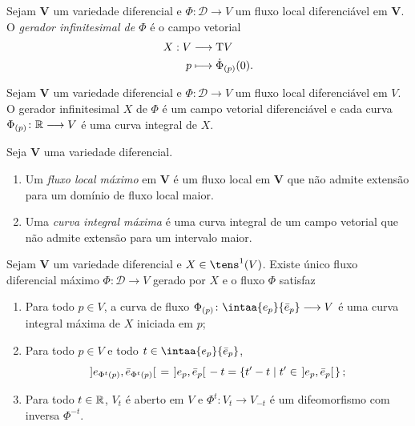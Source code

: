 \begin{defi}
Sejam $\bm V$ um variedade diferencial e $\Phi\colon \mathscr{D} \to V$ um fluxo local diferenciável em $\bm V$. O \emph{gerador infinitesimal de $\Phi$} é o campo vetorial
	\begin{align*}
	{X}: {V} &\longrightarrow {\mathrm{T}V} \\{p} &\longmapsto {\dot \Phi_{(p)}(0)}.
	\end{align*}
\end{defi}

\begin{prop}
Sejam $\bm V$ um variedade diferencial e $\Phi\colon \mathscr{D} \to V$ um fluxo local diferenciável em $V$. O gerador infinitesimal $X$ de $\Phi$ é um campo vetorial diferenciável e cada curva $\Phi_{(p)}\colon \mathbb{R} \longrightarrow V$ é uma curva integral de $X$.
\end{prop}

\begin{defi}
Seja $\bm V$ uma variedade diferencial.
	\begin{enumerate}
	\item Um \emph{fluxo local máximo} em $\bm V$ é um fluxo local em $\bm V$ que não admite extensão para um domínio de fluxo local maior.
	
	\item Uma \emph{curva integral máxima} é uma curva integral de um campo vetorial que não admite extensão para um intervalo maior.
	\end{enumerate}
\end{defi}

\begin{prop}
Sejam $\bm V$ um variedade diferencial e $X \in \tens^1(V)$. Existe único fluxo diferencial máximo $\Phi\colon \mathscr{D} \to V$ gerado por $X$ e o fluxo $\Phi$ satisfaz
	\begin{enumerate}
	\item Para todo $p \in V$, a curva de fluxo $\Phi_{(p)}\colon \intaa{e_p}{\bar e_p} \to V$ é uma curva integral máxima de $X$ iniciada em $p$;
	
	\item Para todo $p \in V$ e todo $t \in \intaa{e_p}{\bar e_p}$,
	\begin{equation*}
	\left.]e_{\Phi^t(p)},\bar e_{\Phi^t(p)}[\right. = \left.]e_p,\bar e_p[\right. - t = \left\{t'-t \;\middle\vert\; t' \in \left.]e_p,\bar e_p[\right. \right\};
	\end{equation*}
	
	\item Para todo $t \in \mathbb{R}$, $V_t$ é aberto em $V$ e $\Phi^t\colon V_t \to V_{-t}$ é um difeomorfismo com inversa $\Phi^{-t}$.
	\end{enumerate}
\end{prop}




